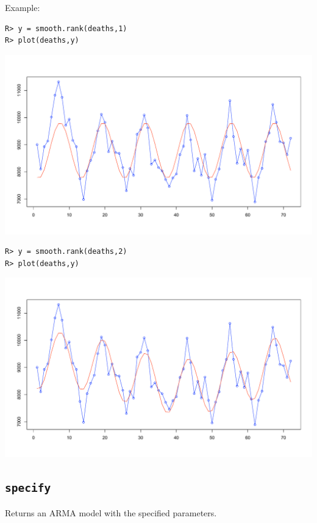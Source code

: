 \documentclass[12pt]{article}
\begin{document}
\bigskip
\noindent
Example:

\begin{verbatim}
R> y = smooth.rank(deaths,1)
R> plot(deaths,y)
\end{verbatim}

\begin{center}
\includegraphics[scale=0.3]{Rplot-14.pdf}
\end{center}

\begin{verbatim}
R> y = smooth.rank(deaths,2)
R> plot(deaths,y)
\end{verbatim}

\begin{center}
\includegraphics[scale=0.3]{Rplot-15.pdf}
\end{center}

\newpage

\subsection{\tt specify}
Returns an ARMA model with the specified parameters.
\end{document}
